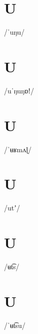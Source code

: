 \documentclass[10pt,a4paper,twoside]{book}
\begin{document}
\section*{U}

\begin{multicols}{3}
 {/ˈuŋu/} {}
\end{multicols}

\section*{U}

\begin{multicols}{3}
 {/uˈŋuŋɒǃ/} {}
\end{multicols}

\section*{U}

\begin{multicols}{3}
 {/ˈʉʁmʌɭ/} {}
\end{multicols}

\section*{U}

\begin{multicols}{3}
 {/utʼ/} {}
\end{multicols}

\section*{U}

\begin{multicols}{3}
 {/ʉt͡s/} {}
\end{multicols}

\section*{U}

\begin{multicols}{3}
 {/ˈʉt͡su/} {}
\end{multicols}
\end{document}
